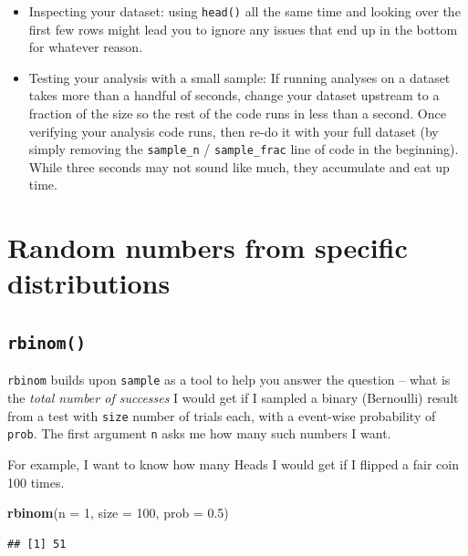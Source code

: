 \documentclass[]{book}
\newenvironment{Shaded}{\begin{snugshade}}{\end{snugshade}}
\newcommand{\KeywordTok}[1]{\textcolor[rgb]{0.13,0.29,0.53}{\textbf{#1}}}
\newcommand{\DataTypeTok}[1]{\textcolor[rgb]{0.13,0.29,0.53}{#1}}
\newcommand{\DecValTok}[1]{\textcolor[rgb]{0.00,0.00,0.81}{#1}}
\newcommand{\FloatTok}[1]{\textcolor[rgb]{0.00,0.00,0.81}{#1}}
\newcommand{\NormalTok}[1]{#1}
\providecommand{\tightlist}{%
  \setlength{\itemsep}{0pt}\setlength{\parskip}{0pt}}
\theoremstyle{definition}
\theoremstyle{definition}
\theoremstyle{definition}
\theoremstyle{remark}
\begin{document}
\begin{itemize}
\tightlist
\item
  Inspecting your dataset: using \texttt{head()} all the same time and
  looking over the first few rows might lead you to ignore any issues
  that end up in the bottom for whatever reason.
\item
  Testing your analysis with a small sample: If running analyses on a
  dataset takes more than a handful of seconds, change your dataset
  upstream to a fraction of the size so the rest of the code runs in
  less than a second. Once verifying your analysis code runs, then re-do
  it with your full dataset (by simply removing the \texttt{sample\_n} /
  \texttt{sample\_frac} line of code in the beginning). While three
  seconds may not sound like much, they accumulate and eat up time.
\end{itemize}

\section{Random numbers from specific
distributions}\label{random-numbers-from-specific-distributions}

\subsection*{\texorpdfstring{\texttt{rbinom()}}{rbinom()}}\label{rbinom}

\texttt{rbinom} builds upon \texttt{sample} as a tool to help you answer
the question -- what is the \emph{total number of successes} I would get
if I sampled a binary (Bernoulli) result from a test with \texttt{size}
number of trials each, with a event-wise probability of \texttt{prob}.
The first argument \texttt{n} asks me how many such numbers I want.

For example, I want to know how many Heads I would get if I flipped a
fair coin 100 times.

\begin{Shaded}
\begin{Highlighting}[]
\KeywordTok{rbinom}\NormalTok{(}\DataTypeTok{n =} \DecValTok{1}\NormalTok{, }\DataTypeTok{size =} \DecValTok{100}\NormalTok{, }\DataTypeTok{prob =} \FloatTok{0.5}\NormalTok{)}
\end{Highlighting}
\end{Shaded}

\begin{verbatim}
## [1] 51
\end{verbatim}
\end{document}
